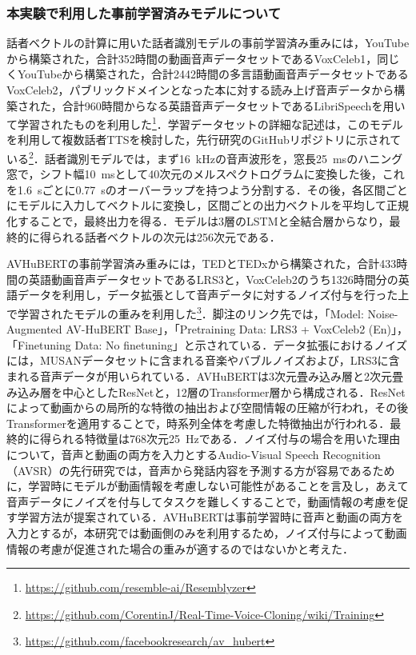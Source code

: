 \subsubsection{本実験で利用した事前学習済みモデルについて}
話者ベクトルの計算に用いた話者識別モデルの事前学習済み重みには，YouTubeから構築された，合計352時間の動画音声データセットであるVoxCeleb1\cite{nagrani2020voxceleb}，同じくYouTubeから構築された，合計2442時間の多言語動画音声データセットであるVoxCeleb2，パブリックドメインとなった本に対する読み上げ音声データから構築された，合計960時間からなる英語音声データセットであるLibriSpeech\cite{panayotov2015librispeech}を用いて学習されたものを利用した\footnote{\url{https://github.com/resemble-ai/Resemblyzer}}．学習データセットの詳細な記述は，このモデルを利用して複数話者TTSを検討した，先行研究\cite{jia2018transfer}のGitHubリポジトリに示されている\footnote{\url{https://github.com/CorentinJ/Real-Time-Voice-Cloning/wiki/Training}}．話者識別モデルでは，まず\SI{16}{\kHz}の音声波形を，窓長\SI{25}{\ms}のハニング窓で，シフト幅\SI{10}{\ms}として40次元のメルスペクトログラムに変換した後，これを\SI{1.6}{\s}ごとに\SI{0.77}{\s}のオーバーラップを持つよう分割する．その後，各区間ごとにモデルに入力してベクトルに変換し，区間ごとの出力ベクトルを平均して正規化することで，最終出力を得る．モデルは3層のLSTMと全結合層からなり，最終的に得られる話者ベクトルの次元は256次元である．

AVHuBERTの事前学習済み重みには，TEDとTEDxから構築された，合計433時間の英語動画音声データセットであるLRS3と，VoxCeleb2のうち1326時間分の英語データを利用し，データ拡張として音声データに対するノイズ付与を行った上で学習されたモデル\cite{shi2022robust}の重みを利用した\footnote{\url{https://github.com/facebookresearch/av_hubert}}．脚注のリンク先では，「Model: Noise-Augmented AV-HuBERT Base」，「Pretraining Data: LRS3 + VoxCeleb2 (En)」，「Finetuning Data: No finetuning」と示されている．データ拡張におけるノイズには，MUSANデータセット\cite{snyder2015musan}に含まれる音楽やバブルノイズおよび，LRS3に含まれる音声データが用いられている．AVHuBERTは3次元畳み込み層と2次元畳み込み層を中心としたResNetと，12層のTransformer層から構成される．ResNetによって動画からの局所的な特徴の抽出および空間情報の圧縮が行われ，その後Transformerを適用することで，時系列全体を考慮した特徴抽出が行われる．最終的に得られる特徴量は768次元\SI{25}{\Hz}である．ノイズ付与の場合を用いた理由について，音声と動画の両方を入力とするAudio-Visual Speech Recognition（AVSR）の先行研究\cite{afouras2018deep}では，音声から発話内容を予測する方が容易であるために，学習時にモデルが動画情報を考慮しない可能性があることを言及し，あえて音声データにノイズを付与してタスクを難しくすることで，動画情報の考慮を促す学習方法が提案されている．AVHuBERTは事前学習時に音声と動画の両方を入力とするが，本研究では動画側のみを利用するため，ノイズ付与によって動画情報の考慮が促進された場合の重みが適するのではないかと考えた．

